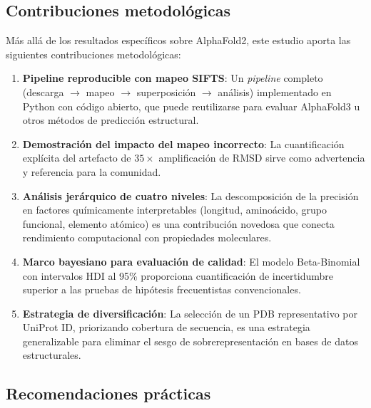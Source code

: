 \subsection{Contribuciones metodol\'ogicas}
\label{subsec:contribuciones_metodologicas}

M\'as all\'a de los resultados espec\'ificos sobre AlphaFold2, este estudio aporta
las siguientes contribuciones metodol\'ogicas:

\begin{enumerate}
    \item \textbf{Pipeline reproducible con mapeo SIFTS}: Un \textit{pipeline} completo
    (descarga $\to$ mapeo $\to$ superposici\'on $\to$ an\'alisis) implementado en Python
    con c\'odigo abierto, que puede reutilizarse para evaluar AlphaFold3 u otros
    m\'etodos de predicci\'on estructural.

    \item \textbf{Demostraci\'on del impacto del mapeo incorrecto}: La cuantificaci\'on
    expl\'icita del artefacto de $35\times$ amplificaci\'on de RMSD sirve como advertencia
    y referencia para la comunidad.

    \item \textbf{An\'alisis jer\'arquico de cuatro niveles}: La descomposici\'on de la
    precisi\'on en factores qu\'imicamente interpretables (longitud, amino\'acido, grupo
    funcional, elemento at\'omico) es una contribuci\'on novedosa que conecta
    rendimiento computacional con propiedades moleculares.

    \item \textbf{Marco bayesiano para evaluaci\'on de calidad}: El modelo Beta-Binomial
    con intervalos HDI al 95\% proporciona cuantificaci\'on de incertidumbre superior
    a las pruebas de hip\'otesis frecuentistas convencionales.

    \item \textbf{Estrategia de diversificaci\'on}: La selecci\'on de un PDB representativo
    por UniProt ID, priorizando cobertura de secuencia, es una estrategia generalizable
    para eliminar el sesgo de sobrerepresentaci\'on en bases de datos estructurales.
\end{enumerate}

\subsection{Recomendaciones pr\'acticas}
\label{subsec:recomendaciones_practicas}

